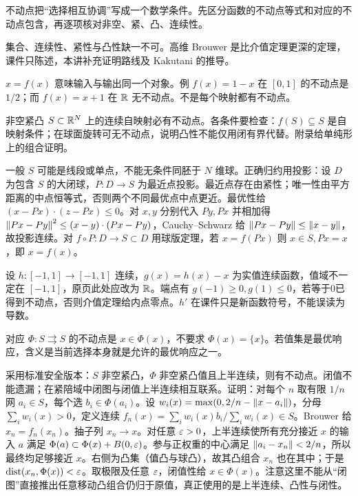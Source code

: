 
不动点把“选择相互协调”写成一个数学条件。先区分函数的不动点等式和对应的不动点包含，再逐项核对非空、紧、凸、连续性。

集合、连续性、紧性与凸性缺一不可。高维 Brouwer 是比介值定理更深的定理，课件只陈述，本讲补充证明路线及 Kakutani 的推导。

$x=f(x)$ 意味输入与输出同一个对象。例 $f(x)=1-x$ 在 $[0,1]$ 的不动点是 $1/2$；而 $f(x)=x+1$ 在 $\mathbb{R}$ 无不动点。不是每个映射都有不动点。

非空紧凸 $S\subset\mathbb{R}^N$ 上的连续自映射必有不动点。各条件要检查：$f(S)\subseteq S$ 是自映射条件；在球面旋转可无不动点，说明凸性不能仅用闭有界代替。附录给单纯形上的组合证明。

一般 $S$ 可能是线段或单点，不能无条件同胚于 $N$ 维球。正确归约用投影：设 $D$ 为包含 $S$ 的大闭球，$P:D\to S$ 为最近点投影。最近点存在由紧性；唯一性由平方距离的中点恒等式，否则两个不同最优点中点更近。最优性给 $(x-Px)\cdot(z-Px)\le0$。对 $x,y$ 分别代入 $Py,Px$ 并相加得 $\left\lVert Px-Py\right\rVert^2\le(x-y)\cdot(Px-Py)$，Cauchy--Schwarz 给 $\left\lVert Px-Py\right\rVert\le\left\lVert x-y\right\rVert$，故投影连续。对 $f\circ P:D\to S\subset D$ 用球版定理，若 $x=f(Px)$ 则 $x\in S,Px=x$，即 $x=f(x)$。

设 $h:[-1,1]\to[-1,1]$ 连续，$g(x)=h(x)-x$ 为实值连续函数，值域不一定在 $[-1,1]$，原页此处应改为 $\mathbb{R}$。端点有 $g(-1)\ge0,g(1)\le0$，若等于0已得到不动点，否则介值定理给内点零点。$h'$ 在课件只是新函数符号，不能误读为导数。

对应 $\Phi:S\rightrightarrows S$ 的不动点是 $x\in\Phi(x)$，不要求 $\Phi(x)=\{x\}$。若值集是最优响应，含义是当前选择本身就是允许的最优响应之一。

采用标准安全版本：$S$ 非空紧凸，$\Phi$ 非空紧凸值且上半连续，则有不动点。闭值不能遗漏；在紧陪域中闭图与闭值上半连续相互联系。证明：对每个 $n$ 取有限 $1/n$ 网 $a_i\in S$，每个选 $b_i\in\Phi(a_i)$。设 $w_i(x)=\max(0,2/n-\left\lVert x-a_i\right\rVert)$，分母 $\sum_iw_i(x)>0$，定义连续 $f_n(x)=\sum_iw_i(x)b_i/\sum_iw_i(x)\in S$。Brouwer 给 $x_n=f_n(x_n)$。抽子列 $x_n\to x$。对任意 $\varepsilon>0$，上半连续使所有充分接近 $x$ 的输入 $a$ 满足 $\Phi(a)\subset\Phi(x)+B(0,\varepsilon)$。参与正权重的中心满足 $\left\lVert a_i-x_n\right\rVert<2/n$，所以最终均足够接近 $x$。右侧为凸集（值凸与球凸），故其凸组合 $x_n$ 也在其中；于是 $\operatorname{dist}(x_n,\Phi(x))<\varepsilon$。取极限及任意 $\varepsilon$，闭值性给 $x\in\Phi(x)$。注意这里不能从“闭图”直接推出任意移动凸组合仍归于原值，真正使用的是上半连续、凸性与闭性。

